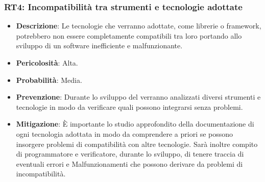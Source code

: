 \subsubsection{RT4: Incompatibilità tra strumenti e tecnologie adottate}
\begin{itemize}
    \item \textbf{Descrizione}: Le tecnologie che verranno adottate, come librerie o framework, potrebbero non essere completamente compatibili tra loro portando allo sviluppo di un software inefficiente e malfunzionante.
    \item \textbf{Pericolosità}: Alta.
    \item \textbf{Probabilità}: Media.
    \item \textbf{Prevenzione}: Durante lo sviluppo del  verranno analizzati diversi strumenti e tecnologie in modo da verificare quali possono integrarsi senza problemi.
    \item \textbf{Mitigazione}: È importante lo studio approfondito della documentazione di ogni tecnologia adottata in modo da comprendere a priori se possono insorgere problemi di compatibilità con altre tecnologie.
    Sarà inoltre compito di programmatore e verificatore, durante lo sviluppo, di tenere traccia di eventuali errori e Malfunzionamenti che possono derivare da problemi di incompatibilità.
\end{itemize}